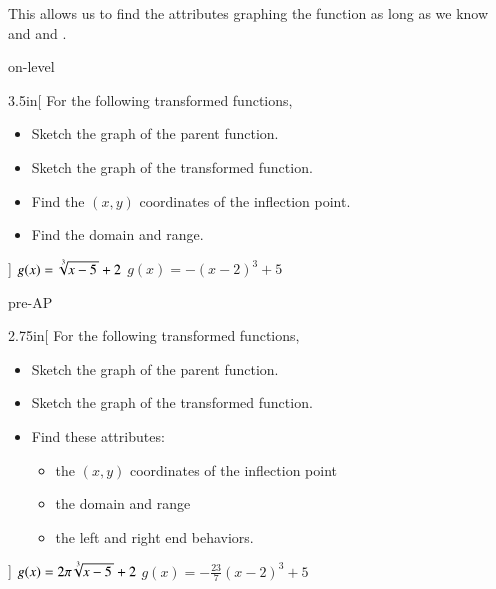 This allows us to find the attributes  graphing the function
as long as we know  and  and .

\begin{taggedblock}{on-level}
    \begin{my2Problems}{3.5in}[
        For the following transformed functions,
        \vspace{-0.75\baselineskip}
        \small
        \begin{itemize}[nosep]
            \item Sketch the graph of the parent function.
            \item Sketch the graph of the transformed function.
            \item Find the $(x,y)$ coordinates of the inflection point.
            \item Find the domain and range.
        \end{itemize}
        ]
        {
            $g(x) = \myRoot[3]{x-5} +2$
        }
        {
            $g(x) = -(x-2)^3 + 5$
        }
    \end{my2Problems}
\end{taggedblock}

\begin{taggedblock}{pre-AP}
    \begin{my2Problems}{2.75in}[
        For the following transformed functions,
        \vspace{-0.75\baselineskip}
        \small
        \begin{itemize}[nosep]
            \item Sketch the graph of the parent function.
            \item Sketch the graph of the transformed function.
            \item Find these attributes:
            \begin{itemize}[nosep]
            \item the $(x,y)$ coordinates of the inflection point
            \item the domain and range
            \item the left and right end behaviors.
            \end{itemize}
        \end{itemize}
        ]
        {
            $g(x) = 2\pi \myRoot[3]{x-5} +2$
        }
        {
            $g(x) = - \frac{23}{7} (x-2)^3 + 5$
        }
    \end{my2Problems}
\end{taggedblock}



